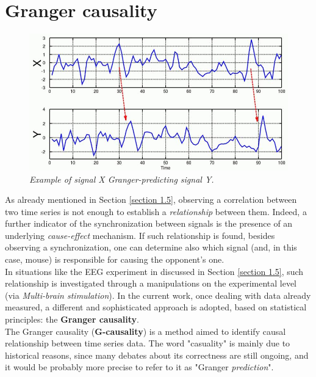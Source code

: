 \documentclass[12pt, a4paper]{report}
\begin{document}
\section{Granger causality} \label{section granger}


\begin{figure}[H]
	\begin{center}
		\hspace*{-1cm}
		\includegraphics[scale=.6]{GC.png} 
	\end{center} 
	\caption{\textit{Example of signal X Granger-predicting signal Y. }} 
	
\end{figure}

As already mentioned in Section \ref{section 1.5}, observing a correlation between two time series 
is not enough to establish a \textit{relationship} between them. Indeed, a further indicator of  the synchronization between signals is the presence of an underlying \textit{cause-effect} mechanism. If such relationship is found, besides observing a synchronization, one can determine also which signal (and, in this case, mouse) is responsible for causing the opponent's one.\\
In situations like the EEG experiment in \cite{15} %
 discussed in Section \ref{section 1.5}, such relationship is investigated through a manipulations on the experimental level (via \textit{Multi-brain stimulation}). In  the current work, once dealing with data already measured, a different and sophisticated approach is adopted, based on statistical principles: the \textbf{Granger causality}.\\
The Granger causality (\textbf{G-causality}) is a method aimed to identify causal relationship between time series data. The word "casuality" is mainly due to historical reasons, since many debates about its correctness are still ongoing, and it would be probably more precise to refer to it as "Granger \textit{prediction}".
\\
\end{document}
